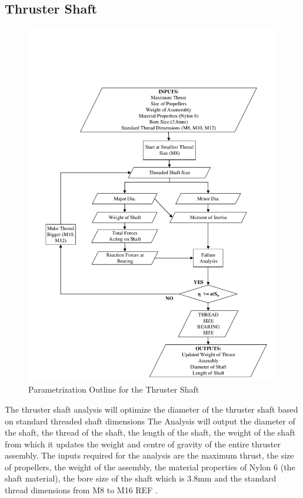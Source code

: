 \documentclass[../main.tex]{subfiles}
\begin{document}
\subsection{Thruster Shaft} \label{thrustShaft}

\begin{figure}[H]
	\centering
	\includegraphics[width=.9\linewidth]{img/paramaterization/thrusterShaft.pdf}
	\caption{Parametrization Outline for the Thruster Shaft}
	\label{fig:ThrusterShaftParametrization}
\end{figure}

The thruster shaft analysis will optimize the diameter of the thruster shaft based on standard threaded shaft dimensions The Analysis will output the diameter of the shaft, the thread of the shaft, the length of the shaft, the weight of the shaft from which it updates the weight and centre of gravity of the entire thruster assembly. The inputs required for the analysis are the maximum thrust, the size of propellers, the weight of the assembly, the material properties of Nylon 6 \cite{Nylon6} (the shaft material), the bore size of the shaft which is 3.8mm and the standard thread dimensions from M8 to M16 REF \cite{threadSizes}.\\
\end{document}
